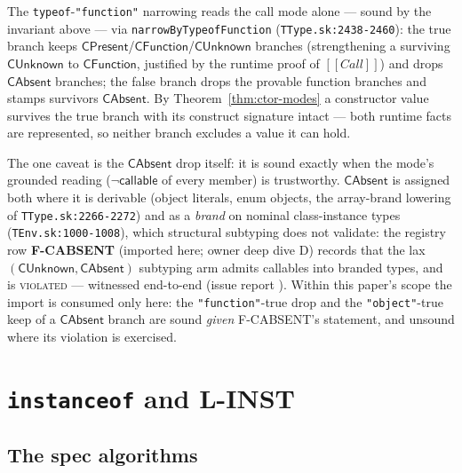 \documentclass[11pt]{article}
\newcommand{\intm}[1]{[[#1]]}
\begin{document}
The \texttt{typeof}-\texttt{"function"} narrowing reads the call mode
alone — sound by the invariant above — via
\texttt{narrowByTypeofFunction}
(\texttt{TType.sk:2438-2460}): the true branch keeps
$\mathsf{CPresent}$/$\mathsf{CFunction}$/$\mathsf{CUnknown}$ branches
(strengthening a surviving $\mathsf{CUnknown}$ to $\mathsf{CFunction}$,
justified by the runtime proof of $\intm{Call}$) and drops
$\mathsf{CAbsent}$ branches; the false branch drops the provable
function branches and stamps survivors $\mathsf{CAbsent}$. By
Theorem~\ref{thm:ctor-modes} a constructor value survives the true
branch with its construct signature intact — both runtime facts are
represented, so neither branch excludes a value it can hold.

The one caveat is the $\mathsf{CAbsent}$ drop itself: it is sound
exactly when the mode's grounded reading
($\neg\mathsf{callable}$ of every member) is trustworthy.
$\mathsf{CAbsent}$ is assigned both where it is derivable (object
literals, enum objects, the array-brand lowering of
\texttt{TType.sk:2266-2272}) and as a \emph{brand} on nominal
class-instance types (\texttt{TEnv.sk:1000-1008}), which structural
subtyping does not validate: the registry row \textbf{F-CABSENT}
(imported here; owner deep dive D) records that the lax
$(\mathsf{CUnknown},\mathsf{CAbsent})$ subtyping arm admits callables
into branded types, and is \textsc{violated} — witnessed end-to-end
(issue report ). Within this
paper's scope the import is consumed only here: the
\texttt{"function"}-true drop and the \texttt{"object"}-true keep of a
$\mathsf{CAbsent}$ branch are sound \emph{given} F-CABSENT's statement,
and unsound where its violation is exercised.

\section{\texttt{instanceof} and \textbf{L-INST}}
\label{sec:inst}

\subsection{The spec algorithms}
\end{document}
